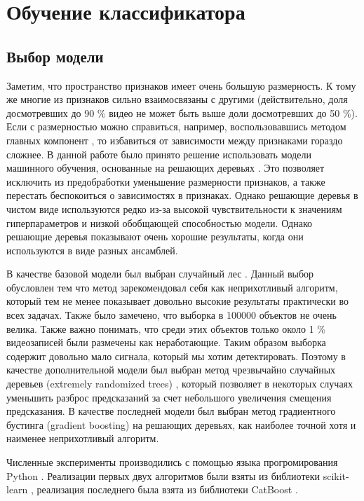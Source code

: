 \chapter{Обучение классификатора}

\section{Выбор модели}

Заметим, что пространство признаков имеет очень большую размерность. К тому же многие из признаков сильно взаимосвязаны с другими (действительно, доля досмотревших до 90 \% видео не может быть выше доли досмотревших до 50 \%). Если с размерностью можно справиться, например, воспользовавшись методом главных компонент \cite{Pearson1901}, то избавиться от зависимости между признаками гораздо сложнее. В данной работе было принято решение использовать модели машинного обучения, основанные на решающих деревьях \cite{Breiman2017}. Это позволяет исключить из предобработки уменьшение размерности признаков, а также перестать беспокоиться о зависимостях в признаках. Однако решающие деревья в чистом виде используются редко из-за высокой чувствительности к значениям гиперпараметров и низкой обобщающей способностью модели. Однако решающие деревья показывают очень хорошие результаты, когда они используются в виде разных ансамблей.

В качестве базовой модели был выбран случайный лес \cite{Ho}. Данный выбор обусловлен тем что метод зарекомендовал себя как неприхотливый алгоритм, который тем не менее показывает довольно высокие результаты практически во всех задачах. Также было замечено, что выборка в 100000 объектов не очень велика. Также важно понимать, что среди этих объектов только около 1 \% видеозаписей были размечены как неработающие. Таким образом выборка содержит довольно мало сигнала, который мы хотим детектировать. Поэтому в качестве дополнительной модели был выбран метод чрезвычайно случайных деревьев (extremely randomized trees) \cite{Geurts2006}, который позволяет в некоторых случаях уменьшить разброс предсказаний за счет небольшого увеличения смещения предсказания. В качестве последней модели был выбран метод градиентного бустинга (gradient boosting) \cite{Friedman2001} на решающих деревьях, как наиболее точной хотя и наименее неприхотливый алгоритм.

Численные эксперименты производились с помощью языка прогромирования Python \cite{Python}. Реализации первых двух алгоритмов были взяты из библиотеки scikit-learn \cite{scikit-learn}, реализация последнего была взята из библиотеки CatBoost \cite{Prokhorenkova2017}.

